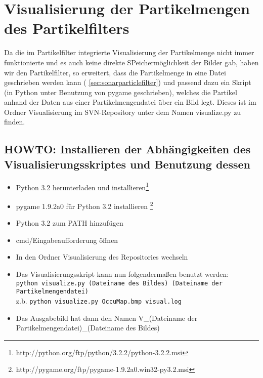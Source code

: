 \section{Visualisierung der Partikelmengen des Partikelfilters}
Da die im Partikelfilter integrierte Visualisierung der Partikelmenge
nicht immer funktionierte und es auch keine direkte SPeichermöglichkeit der
 Bilder gab, haben wir den Partikelfilter, so erweitert, dass die
Partikelmenge in eine Datei geschrieben werden kann (
\ref{sec:sonarparticlefilter}) und passend dazu ein Skript (in Python unter
 Benutzung von pygame geschrieben), welches die Partikel anhand der Daten
 aus einer Partikelmengendatei über ein Bild legt. Dieses ist im Ordner
 Visualisierung im SVN-Repository unter dem Namen visualize.py zu finden.

 \subsection{HOWTO: Installieren der Abhängigkeiten des
Visualisierungsskriptes und Benutzung dessen}
 \begin{itemize}
	 \item Python 3.2 herunterladen und installieren\footnote{http://python.org/ftp/python/3.2.2/python-3.2.2.msi}
	 \item pygame 1.9.2a0 für Python 3.2 installieren \footnote{http://pygame.org/ftp/pygame-1.9.2a0.win32-py3.2.msi}
	 \item Python 3.2 zum PATH hinzufügen
	 \item cmd/Eingabeaufforderung öffnen
	 \item In den Ordner Visualisierung des Repositories wechseln
	 \item Das Visualisierungsskript kann nun folgendermaßen benutzt werden:\\
	 		\lstinline|python visualize.py (Dateiname des Bildes) (Dateiname der Partikelmengendatei)| \\
 			z.b. \lstinline|python visualize.py OccuMap.bmp visual.log|
	 \item Das Ausgabebild hat dann den Namen V\_(Dateiname der Partikelmengendatei)\_(Dateiname des Bildes)
\end{itemize}